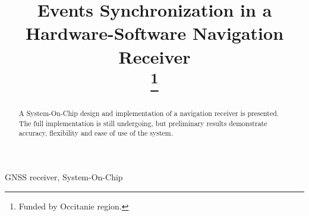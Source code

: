 \documentclass[conference]{IEEEtran}
\begin{document}
\title{Events Synchronization in a Hardware-Software Navigation Receiver\\
\thanks{Funded by Occitanie region.}
}

\author{
\and
{}
\and
{}
\and
{}
}

\maketitle

\begin{abstract}
A System-On-Chip design and implementation of a navigation receiver is presented. The full implementation is still undergoing, but preliminary results demonstrate accuracy, flexibility and ease of use of the system.
\end{abstract}

\begin{IEEEkeywords}
GNSS receiver, System-On-Chip
\end{IEEEkeywords}
\end{document}

